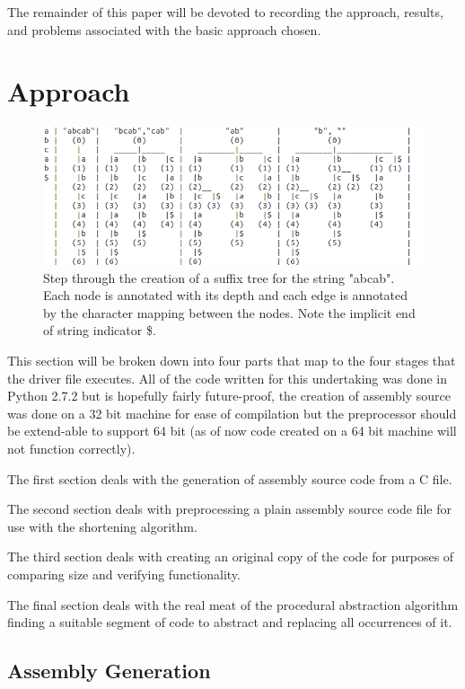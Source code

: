 \documentclass[9pt,nocopyrightspace]{sigplanconf}
\begin{document}
The remainder of this paper will be devoted to recording the approach, results, and problems associated with the basic approach chosen.

\section{Approach}

\begin{figure}
\includegraphics[width=\textwidth]{tree_diagram}
\caption{Step through the creation of a suffix tree for the string "abcab". Each node is annotated with its depth and each edge is annotated by the character mapping between the nodes. Note the implicit end of string indicator \$.}
\end{figure}

This section will be broken down into four parts that map to the four stages that the driver file executes.
All of the code written for this undertaking was done in Python 2.7.2 but is hopefully fairly future-proof, the creation of assembly source was done on a 32 bit machine for ease of compilation but the preprocessor should be extend-able to support 64 bit (as of now code created on a 64 bit machine will not function correctly).

The first section deals with the generation of assembly source code from a C file.

The second section deals with preprocessing a plain assembly source code file for use with the shortening algorithm.

The third section deals with creating an original copy of the code for purposes of comparing size and verifying functionality.

The final section deals with the real meat of the procedural abstraction algorithm finding a suitable segment of code to abstract  and replacing all occurrences of it.

\subsection{Assembly Generation}
\end{document}
